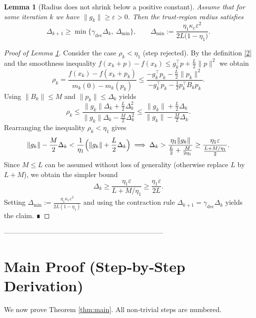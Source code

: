 \documentclass{article}
\newtheorem{lemma}{Lemma}
\begin{document}
\begin{lemma}[Radius does not shrink below a positive constant]\label{lem:radius-lower}
Assume that for some iteration \(k\) we have
\(\|g_{k}\|\ge\varepsilon>0\). Then the trust‑region radius satisfies
\[
\Delta_{k+1}\ge\min\bigl\{\gamma_{\mathrm{dec}}\Delta_{k},
\ \Delta_{\min}\bigr\},
\qquad
\Delta_{\min}:=
\frac{\eta_{1}\kappa_{\mathrm{c}}\varepsilon^{2}}
{2L\bigl(1-\eta_{1}\bigr)}.
\tag{L3}
\]
\end{lemma}
\begin{proof}[Proof of Lemma \ref{lem:radius-lower}]
Consider the case \(\rho_{k}<\eta_{1}\) (step rejected). By the definition
\eqref{2} and the smoothness inequality
\(f(x_{k}+p)-f(x_{k})\le g_{k}^{\top}p+\frac{L}{2}\|p\|^{2}\) we obtain
\[
\rho_{k}
=\frac{f(x_{k})-f(x_{k}+p_{k})}{m_{k}(0)-m_{k}(p_{k})}
\le\frac{-g_{k}^{\top}p_{k}-\frac{L}{2}\|p_{k}\|^{2}}
{-g_{k}^{\top}p_{k}-\frac12 p_{k}^{\top}B_{k}p_{k}} .
\]
Using \(\|B_{k}\|\le M\) and \(\|p_{k}\|\le\Delta_{k}\) yields
\[
\rho_{k}\le
\frac{\|g_{k}\|\Delta_{k}+\frac{L}{2}\Delta_{k}^{2}}
{\|g_{k}\|\Delta_{k}-\frac{M}{2}\Delta_{k}^{2}}
\le
\frac{\|g_{k}\|+\frac{L}{2}\Delta_{k}}
{\|g_{k}\|-\frac{M}{2}\Delta_{k}} .
\]
Rearranging the inequality \(\rho_{k}<\eta_{1}\) gives
\[
\|g_{k}\|-\frac{M}{2}\Delta_{k}
<\frac{1}{\eta_{1}}\Bigl(\|g_{k}\|+\frac{L}{2}\Delta_{k}\Bigr)
\;\Longrightarrow\;
\Delta_{k}
>\frac{\eta_{1}\|g_{k}\|}{\frac{L}{2}+ \frac{M}{2\eta_{1}}}
\ge
\frac{\eta_{1}\varepsilon}{\frac{L+M/\eta_{1}}{2}}.
\]
Since \(M\le L\) can be assumed without loss of generality (otherwise
replace \(L\) by \(L+M\)), we obtain the simpler bound
\[
\Delta_{k}\ge
\frac{\eta_{1}\varepsilon}{L+M/\eta_{1}}
\ge
\frac{\eta_{1}\varepsilon}{2L}.
\]
Setting \(\Delta_{\min}:=\frac{\eta_{1}\kappa_{\mathrm{c}}\varepsilon^{2}}
{2L(1-\eta_{1})}\) and using the contraction rule
\(\Delta_{k+1}=\gamma_{\mathrm{dec}}\Delta_{k}\) yields the claim. ∎
\end{proof}

---------------------------------------------------------------------

\section*{Main Proof (Step‑by‑Step Derivation)}
We now prove Theorem \ref{thm:main}.  All non‑trivial steps are numbered.
\end{document}
